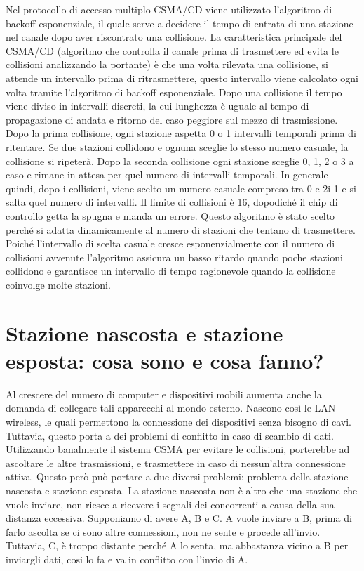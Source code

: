 Nel protocollo di accesso multiplo CSMA/CD viene utilizzato l’algoritmo di backoff esponenziale, il quale serve a decidere il tempo di entrata di una stazione nel canale dopo aver riscontrato una collisione.
La caratteristica principale del CSMA/CD (algoritmo che controlla il canale prima di trasmettere ed evita le collisioni analizzando la portante) è che una volta rilevata una collisione, si attende un intervallo prima di ritrasmettere, questo intervallo viene calcolato ogni volta tramite l’algoritmo di backoff esponenziale.
Dopo una collisione il tempo viene diviso in intervalli discreti, la cui lunghezza è uguale al tempo di propagazione di andata e ritorno del caso peggiore sul mezzo di trasmissione.
Dopo la prima collisione, ogni stazione aspetta 0 o 1 intervalli temporali prima di ritentare. Se due stazioni collidono e ognuna sceglie lo stesso numero casuale, la collisione si ripeterà. Dopo la seconda collisione ogni stazione sceglie 0, 1, 2 o 3 a caso e rimane in attesa per quel numero di intervalli temporali. In generale quindi, dopo i collisioni, viene scelto un numero casuale compreso tra 0 e 2i-1 e si salta quel numero di intervalli. Il limite di collisioni è 16, dopodiché il chip di controllo getta la spugna e manda un errore.
Questo algoritmo è stato scelto perché si adatta dinamicamente al numero di stazioni che tentano di trasmettere. Poiché l’intervallo di scelta casuale cresce esponenzialmente con il numero di collisioni avvenute l’algoritmo assicura un basso ritardo quando poche stazioni collidono e garantisce un intervallo di tempo ragionevole quando la collisione coinvolge molte stazioni.




\section{Stazione nascosta e stazione esposta: cosa sono e cosa fanno?}

Al crescere del numero di computer e dispositivi mobili aumenta anche la domanda di collegare tali apparecchi al mondo esterno.
Nascono così le LAN wireless, le quali permettono la connessione dei dispositivi senza bisogno di cavi.
Tuttavia, questo porta a dei problemi di conflitto in caso di scambio di dati.
Utilizzando banalmente il sistema CSMA per evitare le collisioni, porterebbe ad ascoltare le altre trasmissioni, e trasmettere in caso di nessun’altra connessione attiva.
Questo però può portare a due diversi problemi: problema della stazione nascosta e stazione esposta.
La stazione nascosta non è altro che una stazione che vuole inviare, non riesce a ricevere i segnali dei concorrenti a causa della sua distanza eccessiva. Supponiamo di avere A, B e C. A vuole inviare a B, prima di farlo ascolta se ci sono altre connessioni, non ne sente e procede all’invio. Tuttavia, C, è troppo distante perché A lo senta, ma abbastanza vicino a B per inviargli dati, cosi lo fa e va in conflitto con l’invio di A.
 
